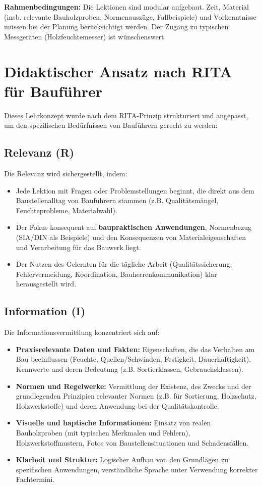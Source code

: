 \documentclass[12pt, a4paper]{article}
\begin{document}
\textbf{Rahmenbedingungen:} Die Lektionen sind modular aufgebaut. Zeit, Material (insb. relevante Bauholzproben, Normenauszüge, Fallbeispiele) und Vorkenntnisse müssen bei der Planung berücksichtigt werden. Der Zugang zu typischen Messgeräten (Holzfeuchtemesser) ist wünschenswert.

\newpage

\section{Didaktischer Ansatz nach RITA für Bauführer}

Dieses Lehrkonzept wurde nach dem RITA-Prinzip strukturiert und angepasst, um den spezifischen Bedürfnissen von Bauführern gerecht zu werden:

\subsection{Relevanz (R)}
Die Relevanz wird sichergestellt, indem:
\begin{itemize}
    \item Jede Lektion mit Fragen oder Problemstellungen beginnt, die direkt aus dem Baustellenalltag von Bauführern stammen (z.B. Qualitätsmängel, Feuchteprobleme, Materialwahl).
    \item Der Fokus konsequent auf \textbf{baupraktischen Anwendungen}, Normenbezug (SIA/DIN als Beispiele) und den Konsequenzen von Materialeigenschaften und Verarbeitung für das Bauwerk liegt.
    \item Der Nutzen des Gelernten für die tägliche Arbeit (Qualitätssicherung, Fehlervermeidung, Koordination, Bauherrenkommunikation) klar herausgestellt wird.
\end{itemize}

\subsection{Information (I)}
Die Informationsvermittlung konzentriert sich auf:
\begin{itemize}
    \item \textbf{Praxisrelevante Daten und Fakten:} Eigenschaften, die das Verhalten am Bau beeinflussen (Feuchte, Quellen/Schwinden, Festigkeit, Dauerhaftigkeit), Kennwerte und deren Bedeutung (z.B. Sortierklassen, Gebrauchsklassen).
    \item \textbf{Normen und Regelwerke:} Vermittlung der Existenz, des Zwecks und der grundlegenden Prinzipien relevanter Normen (z.B. für Sortierung, Holzschutz, Holzwerkstoffe) und deren Anwendung bei der Qualitätskontrolle.
    \item \textbf{Visuelle und haptische Informationen:} Einsatz von realen Bauholzproben (mit typischen Merkmalen und Fehlern), Holzwerkstoffmustern, Fotos von Baustellensituationen und Schadensfällen.
    \item \textbf{Klarheit und Struktur:} Logischer Aufbau von den Grundlagen zu spezifischen Anwendungen, verständliche Sprache unter Verwendung korrekter Fachtermini.
\end{itemize}
\end{document}
